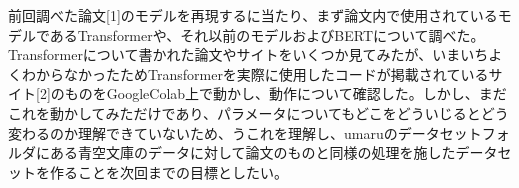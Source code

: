 \documentclass[twocolumn]{jsarticle}     %
\begin{document}
前回調べた論文[1]のモデルを再現するに当たり、まず論文内で使用されているモデルであるTransformerや、それ以前のモデルおよびBERTについて調べた。Transformerについて書かれた論文やサイトをいくつか見てみたが、いまいちよくわからなかったためTransformerを実際に使用したコードが掲載されているサイト[2]のものをGoogleColab上で動かし、動作について確認した。しかし、まだこれを動かしてみただけであり、パラメータについてもどこをどういじるとどう変わるのか理解できていないため、うこれを理解し、umaruのデータセットフォルダにある青空文庫のデータに対して論文のものと同様の処理を施したデータセットを作ることを次回までの目標としたい。



\nocite{*}

\end{document}
